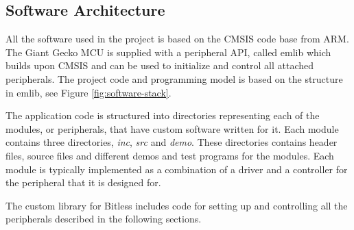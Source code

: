 \subsection{Software Architecture}
All the software used in the project is based on the CMSIS \cite{cmsisapi} code base from
ARM. The Giant Gecko MCU is supplied with a peripheral API,
called emlib \cite{emlibapi} which builds upon CMSIS and can be
used to initialize and control all attached peripherals. The project code and
programming model is based on the structure in emlib, 
see Figure \ref{fig:software-stack}.



The application code is structured into directories representing each of the
modules, or peripherals, that have custom software written for it. Each module
contains three directories, \textit{inc}, \textit{src} and \textit{demo}.
These directories contains header files, source files and different demos and
test programs for the modules. Each module is typically
implemented as a combination of a driver and a controller for the 
peripheral that it is designed for.

The custom library for Bitless includes code for setting up and controlling
all the peripherals described in the following sections. 
